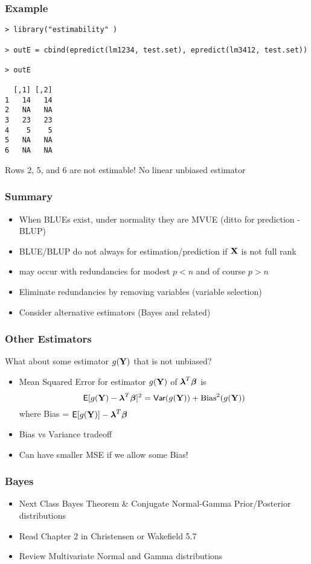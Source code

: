 \documentclass{beamer}
\begin{document}
\begin{frame}[fragile]\frametitle{Example}
\begin{verbatim}
> library("estimability" )

> outE = cbind(epredict(lm1234, test.set), epredict(lm3412, test.set))

> outE

  [,1] [,2]
1   14   14
2   NA   NA
3   23   23
4    5    5
5   NA   NA
6   NA   NA
\end{verbatim}
Rows 2, 5, and 6 are not estimable!  No linear unbiased estimator

  
\end{frame}
\begin{frame} \frametitle{Summary}
  \begin{itemize}
  \item When BLUEs exist,  under normality they are MVUE  (ditto for
    prediction - BLUP) \pause
 \item BLUE/BLUP do not always for estimation/prediction if $\mathbf{X}$ is
   not full rank \pause
\item may occur with redundancies for modest $p < n$ and of course $p
  > n$ \pause
\item Eliminate redundancies by removing variables (variable
  selection) \pause
\item Consider alternative estimators (Bayes and related)
  \end{itemize}
\end{frame}

\begin{frame} \frametitle{Other Estimators}
What about some estimator $g(\mathbf{Y})$ that is not unbiased? \pause
  \begin{itemize}
\item Mean Squared Error for estimator $g(\mathbf{Y})$ of $\boldsymbol{\lambda}^T\boldsymbol{\beta}$ is
$$\textsf{E}[g(\mathbf{Y}) - \boldsymbol{\lambda}^T\boldsymbol{\beta}]^2 = \textsf{Var}(g(\mathbf{Y})) + \text{Bias}^2(g(\mathbf{Y}))$$ 
where Bias = $\textsf{E}[g(\mathbf{Y})] - \boldsymbol{\lambda}^T\boldsymbol{\beta}$  \pause
\item Bias vs Variance tradeoff \pause
\item Can have smaller MSE if we allow some Bias! 
\end{itemize}
\end{frame}

\begin{frame}\frametitle{Bayes}
  \begin{itemize}
  \item  Next Class Bayes Theorem \& Conjugate Normal-Gamma Prior/Posterior   distributions
  \item  Read   Chapter 2 in Christensen or Wakefield 5.7
  \item  Review Multivariate Normal and Gamma distributions
  \end{itemize}





\end{frame}
\end{document}
